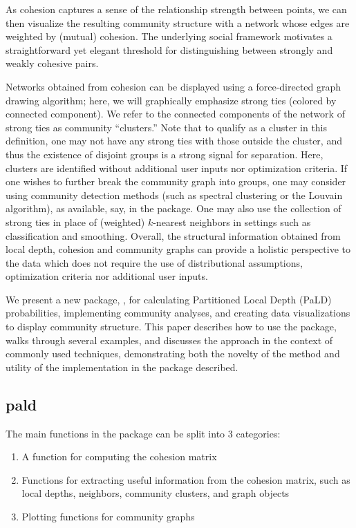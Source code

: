 As cohesion captures a sense of the relationship strength between
points, we can then visualize the resulting community structure with a
network whose edges are weighted by (mutual) cohesion. The underlying
social framework motivates a straightforward yet elegant threshold for
distinguishing between strongly and weakly cohesive pairs.

Networks obtained from cohesion can be displayed using a force-directed
graph drawing algorithm; here, we will graphically emphasize strong ties
(colored by connected component). We refer to the connected components
of the network of strong ties as community ``clusters.'' Note that to
qualify as a cluster in this definition, one may not have any strong
ties with those outside the cluster, and thus the existence of disjoint
groups is a strong signal for separation. Here, clusters are identified
without additional user inputs nor optimization criteria. If one wishes
to further break the community graph into groups, one may consider using
community detection methods (such as spectral clustering or the Louvain
algorithm), as available, say, in the  package. One may
also use the collection of strong ties in place of (weighted)
\(k\)-nearest neighbors in settings such as classification and
smoothing. Overall, the structural information obtained from local
depth, cohesion and community graphs can provide a holistic perspective
to the data which does not require the use of distributional
assumptions, optimization criteria nor additional user inputs.

We present a new package, , for calculating Partitioned
Local Depth (PaLD) probabilities, implementing community analyses, and
creating data visualizations to display community structure. This paper
describes how to use the package, walks through several examples, and
discusses the approach in the context of commonly used techniques,
demonstrating both the novelty of the method and utility of the
implementation in the package described.

\hypertarget{pald}{%
\subsection{pald}\label{pald}}

The main functions in the  package can be split into 3
categories:

\begin{enumerate}
\def\labelenumi{\arabic{enumi}.}
\tightlist
\item
  A function for computing the cohesion matrix
\item
  Functions for extracting useful information from the cohesion matrix,
  such as local depths, neighbors, community clusters, and graph objects
\item
  Plotting functions for community graphs
\end{enumerate}

